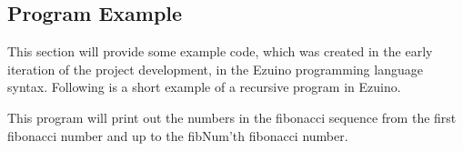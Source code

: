\subsection{Program Example}
This section will provide some example code, which was created in the early iteration of the project development, in the Ezuino programming language syntax.
Following is a short example of a recursive program in Ezuino.

This program will print out the numbers in the fibonacci sequence from the first fibonacci number and up to the fibNum'th fibonacci number.
\noindent\newline